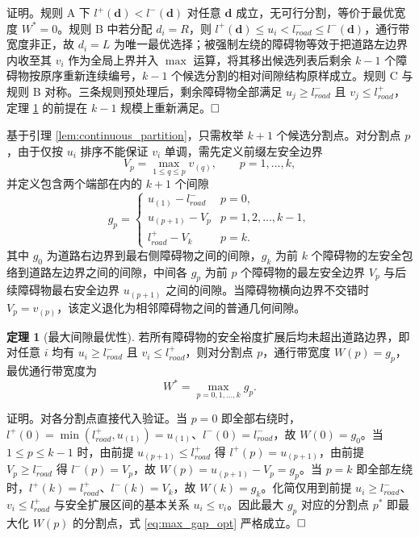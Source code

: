 \documentclass[a4paper,11pt]{ctexart}
\theoremstyle{definition}
\newtheorem{theorem}{定理}[section]
\begin{document}
证明。规则 A 下 $l^{+}(\mathbf{d}) < l^{-}(\mathbf{d})$ 对任意 $\mathbf{d}$ 成立，无可行分割，等价于最优宽度 $W^{*}=0$。规则 B 中若分配 $d_i = R$，则 $l^{+}(\mathbf{d}) \leq u_i < l_{road}^{-} \leq l^{-}(\mathbf{d})$，通行带宽度非正，故 $d_i = L$ 为唯一最优选择；被强制左绕的障碍物等效于把道路左边界内收至其 $v_i$ 作为全局上界并入 $\max$ 运算，将其移出候选列表后剩余 $k-1$ 个障碍物按原序重新连续编号，$k-1$ 个候选分割的相对间隙结构原样成立。规则 C 与规则 B 对称。三条规则预处理后，剩余障碍物全部满足 $u_j \geq l_{road}^{-}$ 且 $v_j \leq l_{road}^{+}$，定理 \ref{thm:max_gap} 的前提在 $k-1$ 规模上重新满足。$\hfill\Box$

基于引理 \ref{lem:continuous_partition}，只需枚举 $k+1$ 个候选分割点。对分割点 $p$，由于仅按 $u_i$ 排序不能保证 $v_i$ 单调，需先定义前缀左安全边界
\begin{equation}
    V_p = \max_{1 \leq q \leq p} v_{(q)}, \qquad p = 1, \ldots, k,
    \label{eq:prefix_v}
\end{equation}
并定义包含两个端部在内的 $k+1$ 个间隙
\begin{equation}
    g_p = \begin{cases}
        u_{(1)} - l_{road}^{-} & p = 0, \\[0.3em]
        u_{(p+1)} - V_p & p = 1, 2, \ldots, k-1, \\[0.3em]
        l_{road}^{+} - V_k & p = k.
    \end{cases}
    \label{eq:gap_def}
\end{equation}
其中 $g_0$ 为道路右边界到最右侧障碍物之间的间隙，$g_k$ 为前 $k$ 个障碍物的左安全包络到道路左边界之间的间隙，中间各 $g_p$ 为前 $p$ 个障碍物的最左安全边界 $V_p$ 与后续障碍物最右安全边界 $u_{(p+1)}$ 之间的间隙。当障碍物横向边界不交错时 $V_p = v_{(p)}$，该定义退化为相邻障碍物之间的普通几何间隙。

\begin{theorem}[最大间隙最优性]
\label{thm:max_gap}
若所有障碍物的安全裕度扩展后均未超出道路边界，即对任意 $i$ 均有 $u_i \geq l_{road}^{-}$ 且 $v_i \leq l_{road}^{+}$，则对分割点 $p$，通行带宽度 $W(p) = g_p$，最优通行带宽度为
\begin{equation}
    W^{*} = \max_{p = 0, 1, \ldots, k} g_p.
    \label{eq:max_gap_opt}
\end{equation}
\end{theorem}

证明。对各分割点直接代入验证。当 $p = 0$ 即全部右绕时，$l^{+}(0) = \min(l_{road}^{+}, u_{(1)}) = u_{(1)}$、$l^{-}(0) = l_{road}^{-}$，故 $W(0) = g_0$。当 $1 \leq p \leq k-1$ 时，由前提 $u_{(p+1)} \leq l_{road}^{+}$ 得 $l^{+}(p) = u_{(p+1)}$，由前提 $V_p \geq l_{road}^{-}$ 得 $l^{-}(p) = V_p$，故 $W(p) = u_{(p+1)} - V_p = g_p$。当 $p = k$ 即全部左绕时，$l^{+}(k) = l_{road}^{+}$、$l^{-}(k) = V_k$，故 $W(k) = g_k$。化简仅用到前提 $u_i \geq l_{road}^{-}$、$v_i \leq l_{road}^{+}$ 与安全扩展区间的基本关系 $u_i \leq v_i$。因此最大 $g_p$ 对应的分割点 $p^{*}$ 即最大化 $W(p)$ 的分割点，式 \eqref{eq:max_gap_opt} 严格成立。$\hfill\Box$
\end{document}
